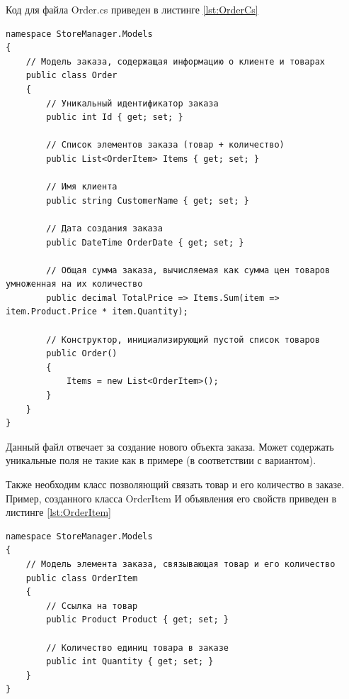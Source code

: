 \documentclass[12pt]{article}
\newcommand{\colorGIT}[1]{\textcolor{CtpGreen}{#1}}
\begin{document}
\noindent Код для файла Order.cs приведен в листинге \ref{lst:OrderCs}

\begin{lstlisting}[style=csharp_catppuccin, label={lst:OrderCs}, caption=Класс \colorGIT{\href{https://github.com/WebMasterIT/Csharp_Labs/blob/ec375afd16c0647b337cf3d8a79c8bef904fc1be/3lab/StoreManager/Models/Order.cs\#L1-L27}{Order.cs}}]
namespace StoreManager.Models
{
    // Модель заказа, содержащая информацию о клиенте и товарах
    public class Order
    {
        // Уникальный идентификатор заказа
        public int Id { get; set; }

        // Список элементов заказа (товар + количество)
        public List<OrderItem> Items { get; set; }

        // Имя клиента
        public string CustomerName { get; set; }

        // Дата создания заказа
        public DateTime OrderDate { get; set; }

        // Общая сумма заказа, вычисляемая как сумма цен товаров умноженная на их количество
        public decimal TotalPrice => Items.Sum(item => item.Product.Price * item.Quantity);

        // Конструктор, инициализирующий пустой список товаров
        public Order()
        {
            Items = new List<OrderItem>();
        }
    }
}
\end{lstlisting}

Данный файл отвечает за создание нового объекта заказа. Может содержать уникальные поля не такие как в примере (в соответствии с вариантом).


{}

Также необходим класс позволяющий связать товар и его количество в заказе. Пример, созданного класса OrderItem И объявления его свойств приведен в листинге \ref{lst:OrderItem}

\begin{lstlisting}[style=csharp_catppuccin, caption=Класс \colorGIT{\href{https://github.com/WebMasterIT/Csharp_Labs/blob/ec375afd16c0647b337cf3d8a79c8bef904fc1be/3lab/StoreManager/Models/OrderItem.cs\#L1-L12}{OrderItem}}, label=lst:OrderItem]
namespace StoreManager.Models
{
    // Модель элемента заказа, связывающая товар и его количество
    public class OrderItem
    {
        // Ссылка на товар
        public Product Product { get; set; }

        // Количество единиц товара в заказе
        public int Quantity { get; set; }
    }
}
\end{lstlisting}
\end{document}
